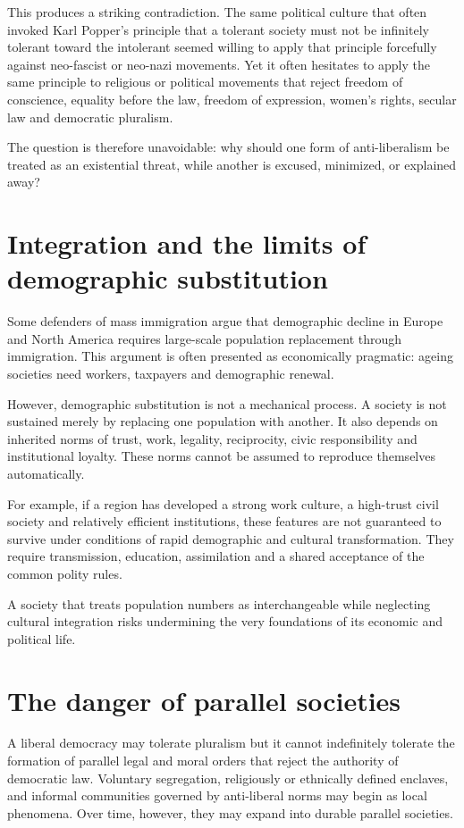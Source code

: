 This produces a striking contradiction. The same political culture that often invoked Karl Popper's principle that a tolerant society must not be infinitely tolerant toward the intolerant seemed willing to apply that principle forcefully against neo-fascist or neo-nazi movements. Yet it often hesitates to apply the same principle to religious or political movements that reject freedom of conscience, equality before the law, freedom of expression, women's rights, secular law and democratic pluralism.

The question is therefore unavoidable: why should one form of anti-liberalism be treated as an existential threat, while another is excused, minimized, or explained away?

\section{Integration and the limits of demographic substitution}

Some defenders of mass immigration argue that demographic decline in Europe and North America requires large-scale population replacement through immigration. This argument is often presented as economically pragmatic: ageing societies need workers, taxpayers and demographic renewal.

However, demographic substitution is not a mechanical process. A society is not sustained merely by replacing one population with another. It also depends on inherited norms of trust, work, legality, reciprocity, civic responsibility and institutional loyalty. These norms cannot be assumed to reproduce themselves automatically.

For example, if a region has developed a strong work culture, a high-trust civil society and relatively efficient institutions, these features are not guaranteed to survive under conditions of rapid demographic and cultural transformation. They require transmission, education, assimilation and a shared acceptance of the common polity rules.

A society that treats population numbers as interchangeable while neglecting cultural integration risks undermining the very foundations of its economic and political life.

\section{The danger of parallel societies}

A liberal democracy may tolerate pluralism but it cannot indefinitely tolerate the formation of parallel legal and moral orders that reject the authority of democratic law. Voluntary segregation, religiously or ethnically defined enclaves, and informal communities governed by anti-liberal norms may begin as local phenomena. Over time, however, they may expand into durable parallel societies.

